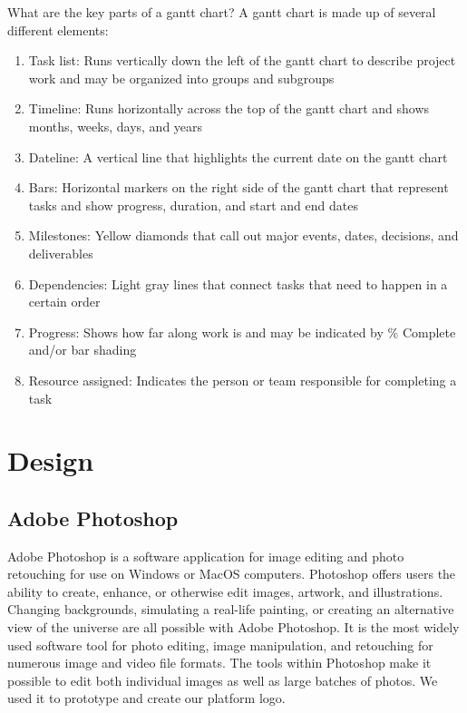 What are the key parts of a gantt chart?
A gantt chart is made up of several different elements:
\begin{enumerate}
      \item
            Task list: Runs vertically down the left of the gantt chart to describe project work and may be organized into groups and subgroups
      \item
            Timeline: Runs horizontally across the top of the gantt chart and shows months, weeks, days, and years
      \item
            Dateline: A vertical line that highlights the current date on the gantt chart
      \item
            Bars: Horizontal markers on the right side of the gantt chart that represent tasks and show progress, duration, and start and end dates
      \item
            Milestones: Yellow diamonds that call out major events, dates, decisions, and deliverables
      \item
            Dependencies: Light gray lines that connect tasks that need to happen in a certain order
      \item
            Progress: Shows how far along work is and may be indicated by \% Complete and/or bar shading
      \item
            Resource assigned: Indicates the person or team responsible for completing a task
\end{enumerate}


\section{Design}
\subsection{Adobe Photoshop}
Adobe Photoshop is a software application for image editing and photo retouching for use on Windows or MacOS computers. Photoshop offers users the ability to create, enhance, or otherwise edit images, artwork, and illustrations. Changing backgrounds, simulating a real-life painting, or creating an alternative view of the universe are all possible with Adobe Photoshop. It is the most widely used software tool for photo editing, image manipulation, and retouching for numerous image and video file formats. The tools within Photoshop make it possible to edit both individual images as well as large batches of photos.
We used it to prototype and create our platform logo.
